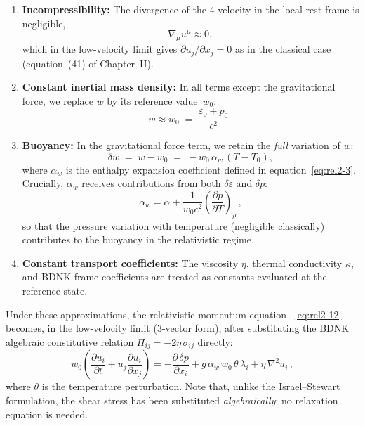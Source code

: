 \begin{enumerate}
\item \textbf{Incompressibility:} The divergence of the 4-velocity in the
  local rest frame is negligible,
  \begin{equation}
  \label{eq:rel2-19}
    \nabla_\mu u^\mu \approx 0,
  \end{equation}
  which in the low-velocity limit gives $\partial u_j / \partial x_j = 0$
  as in the classical case (equation~(41) of Chapter~II).

\item \textbf{Constant inertial mass density:} In all terms except the
  gravitational force, we replace $w$ by its reference value~$w_0$:
  \begin{equation}
  \label{eq:rel2-20}
    w \approx w_0 \;=\; \frac{\varepsilon_0 + p_0}{c^2}\,.
  \end{equation}

\item \textbf{Buoyancy:} In the gravitational force term, we retain the
  \emph{full} variation of $w$:
  \begin{equation}
  \label{eq:rel2-21}
    \delta w \;=\; w - w_0
    \;=\; -w_0\,\alpha_w\,(T - T_0),
  \end{equation}
  where $\alpha_w$ is the enthalpy expansion coefficient defined in
  equation~\eqref{eq:rel2-3}.  Crucially, $\alpha_w$ receives contributions
  from both $\delta\varepsilon$ and $\delta p$:
  \begin{equation}
  \label{eq:rel2-22}
    \alpha_w = \alpha + \frac{1}{w_0 c^2}
    \left(\frac{\partial p}{\partial T}\right)_{\!\rho}\,,
  \end{equation}
  so that the pressure variation with temperature (negligible classically)
  contributes to the buoyancy in the relativistic regime.

\item \textbf{Constant transport coefficients:} The viscosity
  $\eta$, thermal conductivity $\kappa$, and BDNK frame
  coefficients are treated as constants evaluated at the reference state.
\end{enumerate}

Under these approximations, the relativistic momentum equation~%
\eqref{eq:rel2-12} becomes, in the low-velocity limit (3-vector form),
after substituting the BDNK algebraic constitutive relation
$\Pi_{ij} = -2\eta\,\sigma_{ij}$ directly:
\begin{equation}
\label{eq:rel2-23}
  w_0\!\left(\frac{\partial u_i}{\partial t}
    + u_j\frac{\partial u_i}{\partial x_j}\right)
  = -\frac{\partial\,\delta p}{\partial x_i}
    + g\,\alpha_w\,w_0\,\theta\,\lambda_i
    + \eta\,\nabla^2 u_i\,,
\end{equation}
where $\theta$ is the temperature perturbation.  Note that, unlike the
Israel--Stewart formulation, the shear stress has been substituted
\emph{algebraically}; no relaxation equation is needed.


